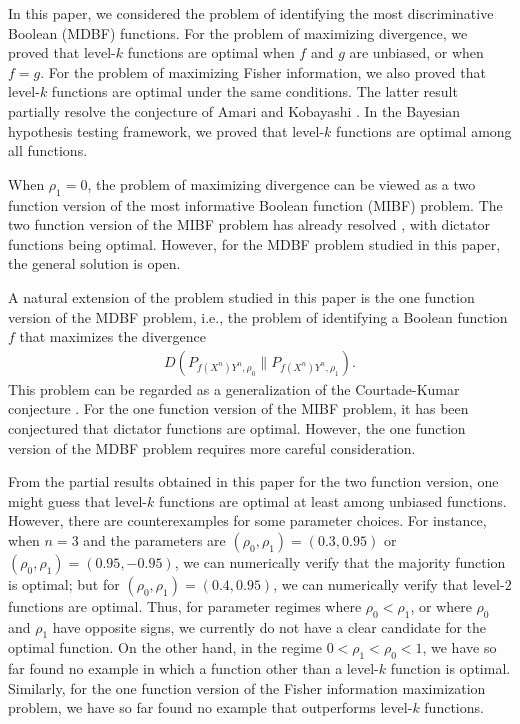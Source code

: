\documentclass[journal,draftcls, onecolumn]{IEEEtran}
\begin{document}
In this paper, we considered the problem of identifying the most discriminative Boolean (MDBF) functions.
For the problem of maximizing divergence, we proved that level-$k$ functions are optimal
when $f$ and $g$ are unbiased, or when $f=g$. For the problem of maximizing Fisher information, we also proved
that level-$k$ functions are optimal under the same conditions. The latter result partially resolve the
conjecture of Amari and Kobayashi \cite{Amari:23,Amari-biograph,KobAma:23}. In the Bayesian hypothesis testing framework, we proved that
level-$k$ functions are optimal among all functions.

When $\rho_1=0$, the problem of maximizing divergence can be viewed as a
two function version of the most informative Boolean function (MIBF) problem.
The two function version of the MIBF problem has already resolved \cite{PicPiaMat:18,Pichler:thesis}, with dictator functions being optimal.
However, for the MDBF problem studied in this paper, the general solution is open. 

A natural extension of the problem studied in this paper is the one function
version of the MDBF problem, i.e., the problem of identifying a Boolean function $f$ that maximizes the divergence
\begin{align*}
D(P_{f(X^n)Y^n,\rho_0}\|P_{f(X^n)Y^n,\rho_1}).
\end{align*}
This problem can be regarded as a generalization of the Courtade-Kumar conjecture \cite{CouKum:14}.
For the one function version of the MIBF problem, it has been conjectured that dictator 
functions are optimal. However, the one function version of the MDBF problem requires 
more careful consideration.

From the partial results obtained in this paper for the two function version,
one might guess that level-$k$ functions are optimal at least among unbiased functions.
However, there are counterexamples for some parameter choices. For instance, 
when $n=3$ and the parameters are $(\rho_0,\rho_1)=(0.3,0.95)$ or $(\rho_0,\rho_1)=(0.95,-0.95)$, we can numerically verify that
the majority function is optimal; but for $(\rho_0,\rho_1)=(0.4,0.95)$, we can numerically verify that level-$2$ functions are optimal. 
Thus, for parameter regimes where $\rho_0 < \rho_1$, or where $\rho_0$ and $\rho_1$
have opposite signs, we currently do not have a clear candidate for the optimal function.
On the other hand, in the regime $0 < \rho_1 < \rho_0 < 1$, we have so far found no
example in which a function other than a level-$k$ function is optimal. 
Similarly, for the one function version of the Fisher information maximization problem,
we have so far found no example that outperforms level-$k$ functions. 
\end{document}
